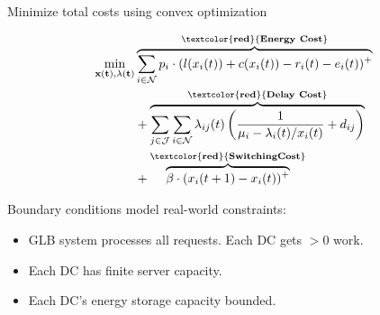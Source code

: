 \documentclass[xcolor=dvipsnames]{beamer}
\begin{document}
\begin{frame}{Minimize total costs using convex optimization}

\begin{align*}
\min_{\bf{x}(t), \bf{\lambda}(t)} 
& \overbrace{ \sum_{i \in \mathcal{N}} p_i \cdot (l(x_i(t)) + c(x_i(t)) - r_i(t) - e_i(t))^+ }^{\bf \textcolor{red}{Energy \ Cost}} \\
& + \overbrace{ \sum_{j \in \mathcal{J}}\sum_{i \in \mathcal{N}} 
\lambda_{ij}(t)\left(\frac{1}{\mu_i - \lambda_i(t)/x_i(t)} + d_{ij}\right) }^{\bf \textcolor{red}{Delay \ Cost}}  \\
& + \overbrace{ \beta \cdot (x_i(t+1) - x_i(t))^+ }^{\bf \textcolor{red}{Switching Cost}}
\end{align*}
\vspace{-2mm}


	\begin{block}{Boundary conditions model real-world constraints:}
	\begin{itemize}
	\item
	GLB system processes all requests. Each DC gets $>0$ work.
	\item
	Each DC has finite server capacity. %
	\item
	Each DC's energy storage capacity bounded.
	\end{itemize}
	\end{block}
\end{frame}
\end{document}
